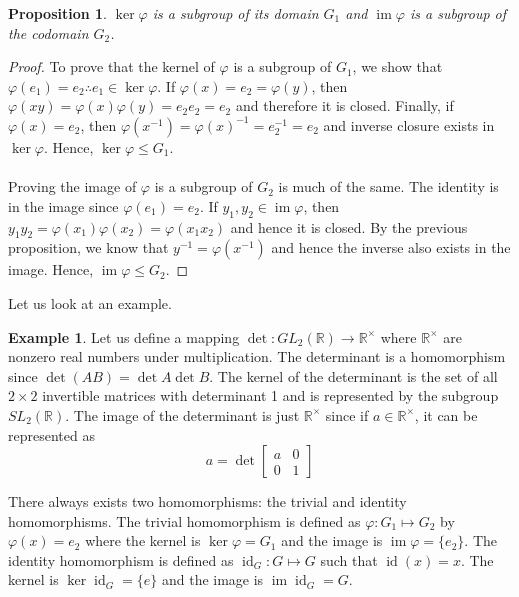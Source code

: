 \documentclass{article}
\newcommand{\R}{\mathbb{R}}
\DeclareMathOperator{\im}{im}
\DeclareMathOperator{\id}{id}
\newtheorem{proposition}[theorem]{Proposition}
\theoremstyle{definition}
\newtheorem{example}[theorem]{Example}
\begin{document}
\begin{proposition}
    $\ker \varphi$ is a subgroup of its domain $G_1$ and $\im \varphi$ is a subgroup of the codomain $G_2$.
\end{proposition}
\begin{proof}
    To prove that the kernel of $\varphi$ is a subgroup of $G_1$, we show that $\varphi(e_1)=e_2 \therefore e_1\in \ker \varphi$. If $\varphi(x)=e_2=\varphi(y)$, then $\varphi (xy)=\varphi(x)\varphi(y)=e_2e_2=e_2$ and therefore it is closed. Finally, if $\varphi(x)=e_2$, then $\varphi(x^{-1})=\varphi(x)^{-1} = e_2^{-1}=e_2$ and inverse closure exists in $\ker \varphi$. Hence, $\ker \varphi \leq G_1$. \\\\
    Proving the image of $\varphi$ is a subgroup of $G_2$ is much of the same. The identity is in the image since $\varphi(e_1)=e_2$. If $y_1,y_2\in \im \varphi$, then $y_1y_2=\varphi(x_1)\varphi(x_2)=\varphi(x_1x_2)$ and hence it is closed. By the previous proposition, we know that $y^{-1} = \varphi(x^{-1})$ and hence the inverse also exists in the image. Hence, $\im \varphi \leq G_2$.
\end{proof}
Let us look at an example. 
\begin{example}
    Let us define a mapping $\det :GL_2(\R) \rightarrow \R^{\times}$ where $\R^{\times}$ are nonzero real numbers under multiplication. The determinant is a homomorphism since $\det(AB)=\det A \det B$. The kernel of the determinant is the set of all $2\times2$ invertible matrices with determinant 1 and is represented by the subgroup $SL_2(\R)$. The image of the determinant is just $\R^{\times}$ since if $a\in \R^{\times}$, it can be represented as
    \begin{equation*}
        a=\det \begin{bmatrix}
            a&0\\0&1
        \end{bmatrix}
    \end{equation*}
\end{example}
There always exists two homomorphisms: the trivial and identity homomorphisms. The trivial homomorphism is defined as $\varphi : G_1 \mapsto G_2$ by $\varphi (x) = e_2$ where the kernel is $\ker \varphi = G_1$ and the image is $\im \varphi = \{e_2\}$. The identity homomorphism is defined as $\id_G :G\mapsto G$ such that $\id (x)=x$. The kernel is $\ker \id_G = \{ e\}$ and the image is $\im \id_G = G$.
\end{document}
